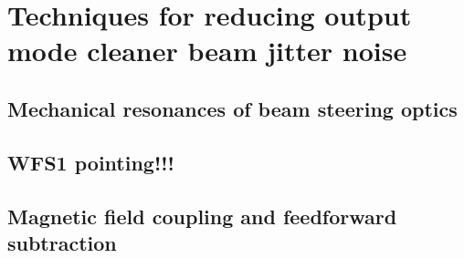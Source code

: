 \chapter{Techniques for reducing output mode cleaner beam jitter noise}

\section{Mechanical resonances of beam steering optics}

\section{WFS1 pointing!!!}

\section{Magnetic field coupling and feedforward subtraction}

